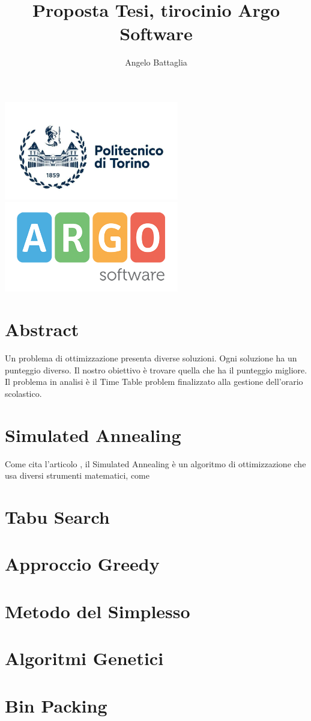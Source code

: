 \documentclass{article}
\author{Angelo Battaglia}
\title{Proposta Tesi, tirocinio Argo Software}
\begin{document}
\maketitle

\begin{center}
\includegraphics[width=3in]{polito.jpg}
\includegraphics[width=3in]{og_logoargosoft.png}
\end{center}

\section{Abstract}

Un problema di ottimizzazione presenta diverse soluzioni. Ogni soluzione
ha un punteggio diverso. Il nostro obiettivo è trovare quella che ha il punteggio
migliore. Il problema in analisi è il Time Table problem finalizzato alla 
gestione dell'orario scolastico.

\section{Simulated Annealing}

Come cita l'articolo \textcite{SimulatedAnnealing01}, il Simulated Annealing
è un algoritmo di ottimizzazione che usa diversi strumenti matematici, come  

\section{Tabu Search}

\section{Approccio Greedy}

\section{Metodo del Simplesso}

\section{Algoritmi Genetici}

\section{Bin Packing}

\printbibliography
\end{document}
